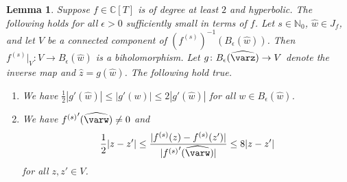 \documentclass[12pt,oneside,a4]{amsart}
\newcommand{\IC}{\mathbb{C}}
\newcommand{\IN}{\mathbb{N}}
\newcounter{maincounter}
\numberwithin{maincounter}{section}
\numberwithin{equation}{section}
\newtheorem{lemma}[maincounter]{Lemma}
\begin{document}
\begin{lemma}
  \label{lem:fninvuniform_new1}
  Suppose $f\in\IC[T]$ is of degree at least $2$ and
  hyperbolic. The following holds for all $\epsilon > 0$  sufficiently small in terms of
  $f$. Let
  $s\in\IN_0$, $\widehat w\in J_{f}$, and let
  $V$ be a connected component of $(f^{(s)})^{-1}(B_{\epsilon}(\widehat{w}))$.
  Then $f^{(s)}|_V\colon V\rightarrow B_{\epsilon}(\widehat{w})$ is
  a biholomorphism.
  Let $g\colon
  B_{\epsilon}(\widehat{\varz})\rightarrow V$ denote the inverse map and
  $\widehat z = g(\widehat w)$. The following hold true.
  \begin{enumerate}
  \item[(i)] 
    We have $\frac 12 |g'(\widehat w)|\le |g'(w)|\le 2|g'(\widehat w)|$ for all $w\in
    B_{\epsilon}(\widehat w)$. 
  \item[(ii)]  
    We have ${f^{(s)}}'(\widehat{\varw})\not=0$ and
    \begin{equation*}
      \frac 12 |z-z'| \le \frac{|{f^{(s)}}(z)-{f^{(s)}}(z')|}{|{f^{(s)}}'(\widehat{\varw})|} \le 8 |z-z'|
    \end{equation*}
    for all $z,z'\in V$. 
  \end{enumerate}
\end{lemma}
\end{document}
